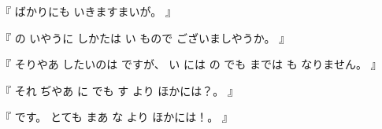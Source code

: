 %
『
ばかりにも
いきますまいが。
』

%
『
の
いやうに
しかたは
い
もので
ございましやうか。
』

%
『
そりやあ
したいのは
ですが、
%
い
には
の
でも
までは
も
なりません。
』

%
『
それ
ぢやあ
に
でも
す
より
ほかには？。
』

%
『
です。
%
とても
まあ
な
より
ほかには！。
』

